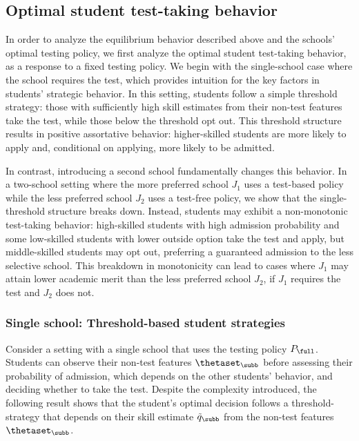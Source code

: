 \subsection{Optimal student test-taking behavior}
\label{sec.testtakingbehavior}

In order to analyze the equilibrium behavior described above and the schools' optimal testing policy, we first analyze the optimal student test-taking behavior, as a response to a fixed testing policy. We begin with the single-school case where the school requires the test, which provides intuition for the key factors in students' strategic behavior. In this setting, students follow a simple threshold strategy: those with sufficiently high skill estimates from their non-test features take the test, while those below the threshold opt out. This threshold structure results in positive assortative behavior: higher-skilled students are more likely to apply and, conditional on applying, more likely to be admitted.

In contrast, introducing a second school fundamentally changes this behavior. In a two-school setting where the more preferred
school $J_1$ uses a test-based policy while the less preferred
school $J_2$ uses a test-free policy, we show that the single-threshold structure breaks down. Instead, students may exhibit a non-monotonic test-taking behavior: high-skilled students with high admission probability and
some low-skilled students with lower outside option take the test and apply, but middle-skilled students may opt out, preferring a guaranteed admission to the less selective school. This breakdown in monotonicity can lead to cases where $J_1$ may attain lower academic merit than the less preferred school $J_2$, if $J_1$ requires the test and $J_2$ does not.



\subsubsection{Single school: Threshold-based student strategies}
\label{sec:singleschoolstratetic}
Consider a setting with a single school that uses the testing policy $P_{\full}$. Students can observe their non-test features $\thetaset_{\subb}$ before assessing their probability of admission, which depends on the other students' behavior, and deciding whether to take the test.
Despite the complexity introduced, the following result shows that the student's optimal decision follows a threshold-strategy that depends on their skill estimate $\tilde q_{\subb}$ from the non-test features $\thetaset_{\subb}$.

